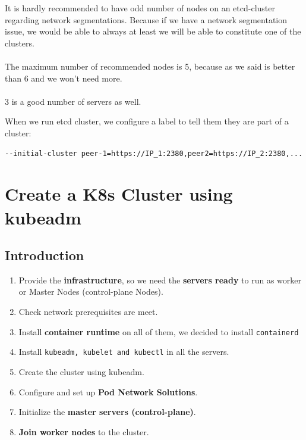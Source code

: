 \documentclass{article}
\newenvironment{blocktemplateIII}[1]{%
    \tcolorbox[beamer,%
    noparskip,breakable,
    ,colframe=Red,%
    colbacklower=LimeGreen!75!LightGreen,%
    title=#1]}%
    {\endtcolorbox}
\newenvironment{codetemplate}[1][]{%
  \mybasecolorbox[#1]
  \itshape
}{%
  \endmybasecolorbox
}
\begin{document}
\begin{blocktemplateIII}{WARNING}
It is hardly recommended to have odd number of nodes on an etcd-cluster regarding network segmentations. Because if we have a network segmentation issue, we would be able to always at least we will be able to constitute one of the clusters.
\\\\
The maximum number of recommended nodes is 5, because as we said is better than 6 and we won't need more.
\\\\
3 is a good number of servers as well.
\end{blocktemplateIII}

When we run etcd cluster, we configure a label to tell them they are part of a cluster:
\begin{codetemplate}{}
\begin{verbatim}
--initial-cluster peer-1=https://IP_1:2380,peer2=https://IP_2:2380,...
\end{verbatim}
\end{codetemplate}

\newpage
\section{Create a K8s Cluster using kubeadm}
\subsection{Introduction}
\begin{enumerate}
    \item Provide the \textbf{infrastructure}, so we need the \textbf{servers ready} to run as worker or Master Nodes (control-plane Nodes).
    \item Check network prerequisites are meet.
    \item Install \textbf{container runtime} on all of them, we decided to install \verb|containerd|
    \item Install \verb|kubeadm, kubelet and kubectl| in all the servers.
    \item Create the cluster using kubeadm.
    \item Configure and set up \textbf{Pod Network Solutions}.
    \item Initialize the \textbf{master servers (control-plane)}.
    \item \textbf{Join worker nodes} to the cluster.
\end{enumerate}
\end{document}
